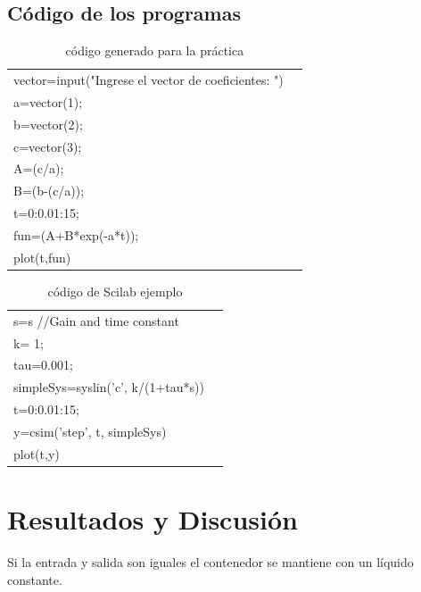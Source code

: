 \documentclass[12pt,letterpaper]{article}     %
\begin{document}
\subsection{Código de los programas}
\begin{table}[htbp]
\begin{center}
\begin{tabular}{|l|l|}
\hline
vector=input("Ingrese el vector de coeficientes: ")\\

a=vector(1);\\
b=vector(2);\\
c=vector(3);\\

A=(c/a);\\
B=(b-(c/a));\\
t=0:0.01:15;\\ 
fun=(A+B*exp(-a*t));\\
plot(t,fun) \\
\hline 

\end{tabular}
\caption{código generado para la práctica}
\label{cód1}
\end{center}
\end{table}

\begin{table}[htb]
\begin{center}
\begin{tabular}{|l|l|}
\hline
s=s%
//Gain and time constant\\
k= 1;\\
tau=0.001;\\
simpleSys=syslin('c', k/(1+tau*s))\\
t=0:0.01:15;\\
y=csim('step', t, simpleSys)\\
plot(t,y)\\
\hline 

\end{tabular}
\caption{código de Scilab ejemplo}
\label{cód2}
\end{center}
\end{table}

\section{Resultados y Discusión}
Si la entrada y salida son iguales el contenedor se mantiene con un líquido constante.\\
\end{document}
